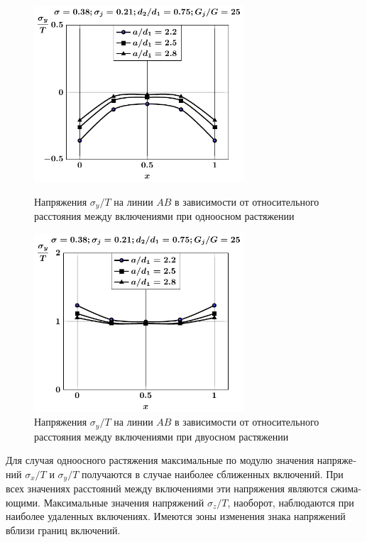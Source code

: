 \begin{russian}
\begin{figure}[h!]
\centering\footnotesize
\parbox[b]{7.5cm}{\centering\includegraphics[width=7.8cm]{inc4-a-d75-g25-t1-sig_y.pdf}
\caption{Напряжения $\sigma_y/T$ на линии $AB$ в зависимости от относительного расстояния между включениями при одноосном растяжении
\label{f:9:62}}}\hfil\hfil
\parbox[b]{7.5cm}{\centering\includegraphics[width=7.8cm]{inc4-a-d75-g25-t2-sig_y.pdf}
\caption{Напряжения $\sigma_y/T$ на линии $AB$ в зависимости от относительного расстояния между включениями при двуосном растяжении
\label{f:9:63}}}
\end{figure}

Для случая одноосного растяжения максимальные по модулю значения напряжений $\sigma_x/T$ и $\sigma_y/T$ получаются в случае наиболее сближенных включений. При всех значениях расстояний между включениями эти напряжения являются сжимающими. Максимальные значения напряжений $\sigma_z/T$, наоборот, наблюдаются при наиболее удаленных включениях. Имеются зоны изменения знака напряжений вблизи границ включений.


\end{russian}
